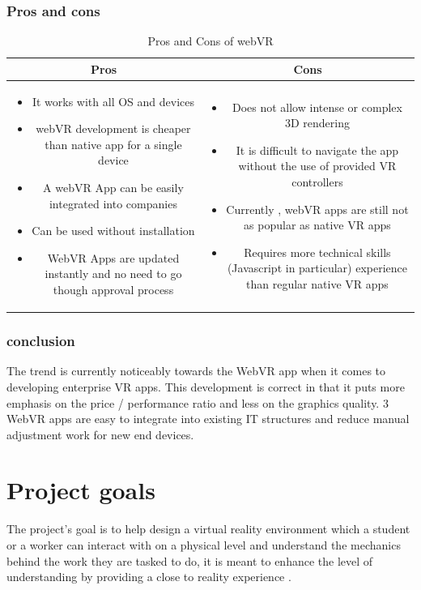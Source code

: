 \documentclass[]{report}
\begin{document}
\subsubsection{Pros and cons}
\begin{table}[H]
	
 \begin{tabular}{|c| c|}
	\toprule Pros & Cons\\\midrule
	\parbox{.45\textwidth}{\begin{itemize}
			\item It works with all OS and devices
			\item webVR development is cheaper
			than native app for a single device
			\item A webVR App can be easily
			integrated into companies
			\item Can be used without installation
			\item WebVR Apps are updated instantly
			and no need to go though approval
			process
	\end{itemize}} & \parbox{.45\textwidth}{\begin{itemize}
			\item Does not allow intense or
			complex 3D rendering
			\item It is difficult to navigate the app
			without the use of provided VR
			controllers
			\item Currently , webVR apps are still
			not as popular as native VR apps
			\item Requires more technical skills
			(Javascript in particular) experience
			than regular native VR apps
	\end{itemize}}\\\bottomrule
\end{tabular}
\caption[Pros and Cons of webVR]{Pros and Cons of webVR}
\end{table}
\subsubsection{conclusion}
The trend is currently noticeably towards the WebVR app when it comes to
developing enterprise VR apps. This development is correct in that it puts more
emphasis on the price / performance ratio and less on the graphics quality.
3
WebVR apps are easy to integrate into existing IT structures and reduce manual
adjustment work for new end devices.

\section{Project goals}
The project’s goal is to help design a virtual reality environment which a
student or a worker can interact with on a physical level and understand the
mechanics behind the work they are tasked to do, it is meant to enhance the
level of understanding by providing a close to reality experience .
\end{document}
